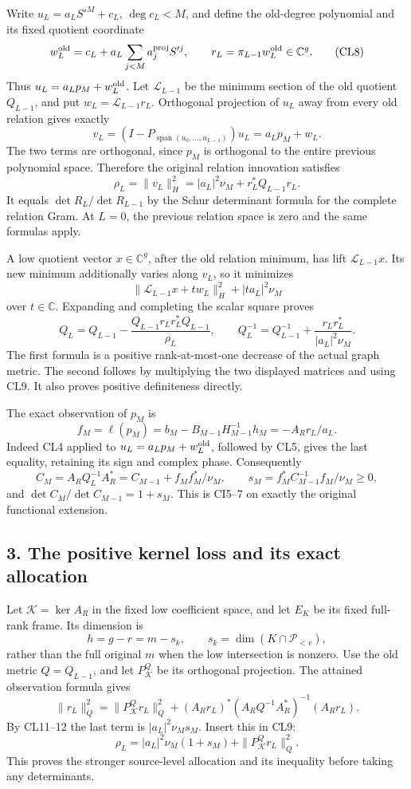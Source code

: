 \documentclass[11pt]{article}
\begin{document}
Write \(u_L=a_LS'^M+c_L\), \(\deg c_L<M\), and define the old-degree polynomial and its fixed quotient coordinate \[
w_L^{\rm old}=c_L+a_L\sum_{j<M}a_j^{\rm proj}S'^j,\qquad
r_L=\pi_{L-1}w_L^{\rm old}\in\mathbb C^g.
\tag{CL8}
\] Thus \(u_L=a_Lp_M+w_L^{\rm old}\). Let \(\mathcal L_{L-1}\) be the minimum section of the old quotient \(Q_{L-1}\), and put \(w_L=\mathcal L_{L-1}r_L\). Orthogonal projection of \(u_L\) away from every old relation gives exactly \[
v_L=(I-P_{\operatorname{span}(u_0,\ldots,u_{L-1})})u_L
=a_Lp_M+w_L.
\] The two terms are orthogonal, since \(p_M\) is orthogonal to the entire previous polynomial space. Therefore the original relation innovation satisfies \[
\boxed{\rho_L=\|v_L\|_H^2
=|a_L|^2\nu_M+r_L^*Q_{L-1}r_L.}
\tag{CL9}
\] It equals \(\det R_L/\det R_{L-1}\) by the Schur determinant formula for the complete relation Gram. At \(L=0\), the previous relation space is zero and the same formulas apply.

A low quotient vector \(x\in\mathbb C^g\), after the old relation minimum, has lift \(\mathcal L_{L-1}x\). Its new minimum additionally varies along \(v_L\), so it minimizes \[
\|\mathcal L_{L-1}x+t w_L\|_H^2+|ta_L|^2\nu_M
\] over \(t\in\mathbb C\). Expanding and completing the scalar square proves \[
\boxed{
Q_L=Q_{L-1}
-\frac{Q_{L-1}r_Lr_L^*Q_{L-1}}{\rho_L},\qquad
Q_L^{-1}=Q_{L-1}^{-1}
+\frac{r_Lr_L^*}{|a_L|^2\nu_M}.}
\tag{CL10}
\] The first formula is a positive rank-at-most-one decrease of the actual graph metric. The second follows by multiplying the two displayed matrices and using CL9. It also proves positive definiteness directly.

The exact observation of \(p_M\) is \[
f_M=\ell(p_M)=b_M-B_{M-1}H_{M-1}^{-1}h_M
=-A_Rr_L/a_L.
\tag{CL11}
\] Indeed CL4 applied to \(u_L=a_Lp_M+w_L^{\rm old}\), followed by CL5, gives the last equality, retaining its sign and complex phase. Consequently \[
C_M=A_RQ_L^{-1}A_R^*
=C_{M-1}+f_Mf_M^*/\nu_M,\qquad
s_M=f_M^*C_{M-1}^{-1}f_M/\nu_M\ge0,
\tag{CL12}
\] and \(\det C_M/\det C_{M-1}=1+s_M\). This is CI5--7 on exactly the original functional extension.

\subsection{3. The positive kernel loss and its exact allocation}\label{the-positive-kernel-loss-and-its-exact-allocation}

Let \(\mathcal K=\ker A_R\) in the fixed low coefficient space, and let \(E_K\) be its fixed full-rank frame. Its dimension is \[
h=g-r=m-s_k,\qquad s_k=\dim(K\cap\mathcal P_{<v}),
\] rather than the full original \(m\) when the low intersection is nonzero. Use the old metric \(Q=Q_{L-1}\), and let \(P_{\mathcal K}^{Q}\) be its orthogonal projection. The attained observation formula gives \[
\|r_L\|_Q^2
=\|P_{\mathcal K}^{Q}r_L\|_Q^2+
(A_Rr_L)^*(A_RQ^{-1}A_R^*)^{-1}(A_Rr_L).
\] By CL11--12 the last term is \(|a_L|^2\nu_Ms_M\). Insert this in CL9: \[
\boxed{\rho_L=|a_L|^2\nu_M(1+s_M)
+\|P_{\mathcal K}^{Q}r_L\|_Q^2.}
\tag{CL13}
\] This proves the stronger source-level allocation and its inequality before taking any determinants.
\end{document}
